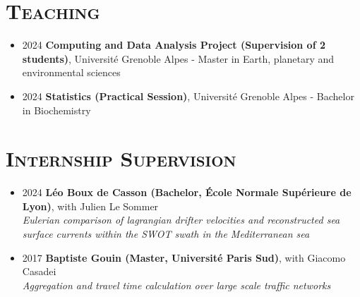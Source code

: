 \documentclass{article}
\begin{document}
\section*{\textsc{Teaching}}
\begin{itemize}
    \item[] 2024 \tabto{2cm} \textbf{Computing and Data Analysis Project (Supervision of 2 students)}, Université Grenoble Alpes - \tabto{2cm} Master in Earth, planetary and environmental sciences
    \item[] 2024 \tabto{2cm} \textbf{Statistics (Practical Session)}, Université Grenoble Alpes - Bachelor in Biochemistry
\end{itemize}

\section*{\textsc{Internship Supervision}}
\begin{itemize}
    \item[] 2024 \tabto{2cm} \textbf{Léo Boux de Casson (Bachelor, École Normale Supérieure de Lyon)}, with Julien Le Sommer \\[.1 cm]
    \tabto{2cm} \textit{Eulerian comparison of lagrangian drifter velocities and reconstructed sea surface currents within the \tabto{2cm} SWOT swath in the Mediterranean sea}
    \item[] 2017 \tabto{2cm} \textbf{Baptiste Gouin (Master, Université Paris Sud)}, with Giacomo Casadei \\[.1 cm]
    \tabto{2cm} \textit{Aggregation and travel time calculation over large scale traffic networks}
\end{itemize}
\end{document}
